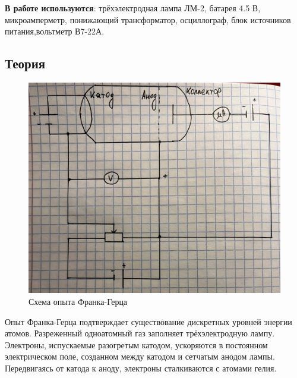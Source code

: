 \documentclass[a4paper, 12pt]{article}%
\begin{document}
\textbf{В работе используются}: трёхэлектродная лампа ЛМ-2, батарея 4.5 В, микроамперметр, понижающий трансформатор, осциллограф, блок источников питания,вольтметр В7-22А.

\subsection{Теория}

\begin{figure}[!h]
    \centering
    \includegraphics[scale=0.25]{hand1.jpg}
    \caption{Схема опыта Франка-Герца}
    \label{fig:vac}
\end{figure}

Опыт Франка-Герца подтверждает существование дискретных уровней энергии атомов. Разреженный одноатомный газ заполняет трёхэлектродную лампу. Электроны, испускаемые разогретым катодом, ускоряются в постоянном электрическом поле, созданном между катодом и сетчатым анодом лампы. Передвигаясь от катода к аноду, электроны сталкиваются с атомами гелия.
\end{document}
